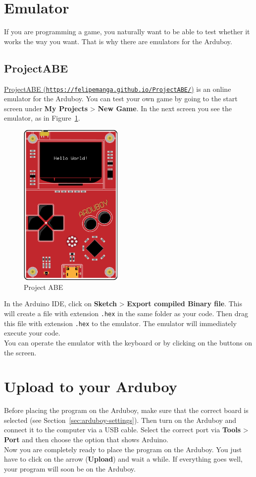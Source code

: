 \documentclass[11pt,fleqn]{book} %
\begin{document}
\newpage
\section{Emulator}
If you are programming a game, you naturally want to be able to test whether it works the way you want. That is why there are emulators for the Arduboy.

\subsection{ProjectABE}
\href{https://felipemanga.github.io/ProjectABE/}{ProjectABE (\texttt{https://felipemanga.github.io/ProjectABE/})} is an online emulator for the Arduboy.
You can test your own game by going to the start screen under \textbf{My Projects} > \textbf{New Game}. In the next screen you see the emulator, as in Figure~\ref{fig:projectabe}.

\begin{figure}
	\centering
	\includegraphics[width=5cm]{assets/ProjectABE}
	\caption{Project ABE}
	\label{fig:projectabe}
\end{figure}

In the Arduino IDE, click on \textbf{Sketch} > \textbf{Export compiled Binary file}. This will create a file with extension \texttt{.hex} in the same folder as your code. Then drag this file with extension \texttt{.hex} to the emulator. The emulator will immediately execute your code. \\
You can operate the emulator with the keyboard or by clicking on the buttons on the screen.

\section{Upload to your Arduboy}
Before placing the program on the Arduboy, make sure that the correct board  is selected (see Section~\ref{sec:arduboy-settings}). Then turn on the Arduboy and connect it to the computer via a USB cable. Select the correct port via \textbf{Tools} > \textbf{Port} and then choose the option that shows Arduino. \\
Now you are completely ready to place the program on the Arduboy. You just have to click on the arrow (\textbf{Upload}) and wait a while. If everything goes well, your program will soon be on the Arduboy.
\end{document}
